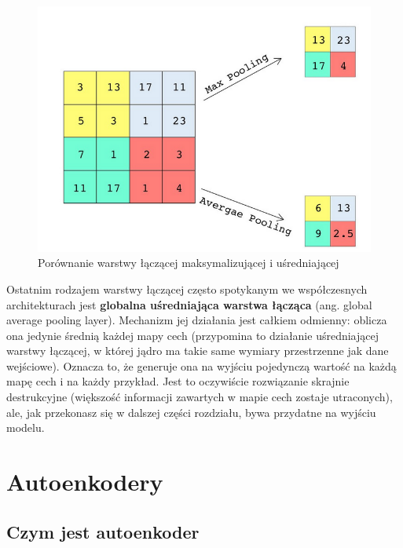\documentclass[12pt]{mwbk}
\theoremstyle{plain}
\theoremstyle{definition}
\theoremstyle{remark}
\newcommand\zrodlo[1]{\par\vspace{-3mm}{\small\textit{Źródło: }#1 }}
\begin{document}
\begin{figure}[!h]
	\centering
	\includegraphics[width=0.7\linewidth]{rys/max_avg_pooling.png}
	\caption{Porównanie warstwy łączącej maksymalizującej i uśredniającej}
	\zrodlo{\cite{geron}}
	\label{fig:max-avg-pooling}
\end{figure}

Ostatnim rodzajem warstwy łączącej często spotykanym we współczesnych architekturach jest
\textbf{globalna uśredniająca warstwa łącząca} (ang. global average pooling layer). Mechanizm jej działania
jest całkiem odmienny: oblicza ona jedynie średnią każdej mapy cech (przypomina to działanie
uśredniającej warstwy łączącej, w której jądro ma takie same wymiary przestrzenne jak dane
wejściowe). Oznacza to, że generuje ona na wyjściu pojedynczą wartość na każdą mapę cech
i na każdy przykład. Jest to oczywiście rozwiązanie skrajnie destrukcyjne (większość informacji
zawartych w mapie cech zostaje utraconych), ale, jak przekonasz się w dalszej części rozdziału,
bywa przydatne na wyjściu modelu.


	
\section{Autoenkodery}
	
\subsection{Czym jest autoenkoder}
\end{document}
